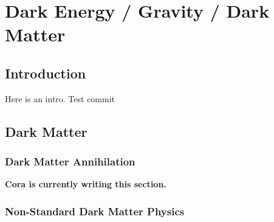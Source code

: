  
\chapter{Dark Energy / Gravity / Dark Matter}
\renewcommand*\thesection{\arabic{section}}

\def\gtrsim{\raise-.75ex\hbox{$\buildrel>\over\sim$}}

\section{Introduction}

Here is an intro.  Test commit

\section{Dark Matter}
\subsection{Dark Matter Annihilation}

{\bf Cora is currently writing this section.}

\subsection{Non-Standard Dark Matter Physics}

